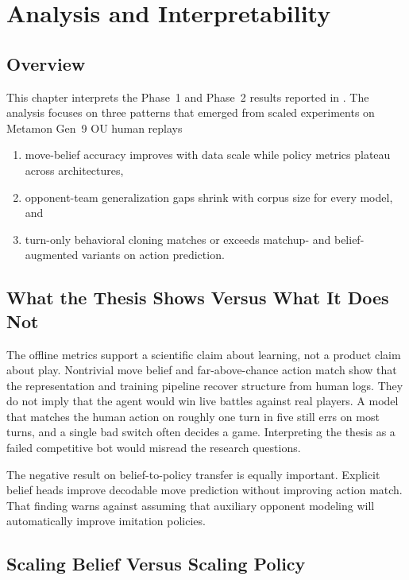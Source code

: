 \chapter{Analysis and Interpretability}
\label{ch:analysis}

\section{Overview}

This chapter interprets the Phase~1 and Phase~2 results reported in
. The analysis focuses on three patterns that emerged from
scaled experiments on Metamon Gen~9 OU human replays
\begin{enumerate}
  \item move-belief accuracy improves with data scale while policy metrics plateau
    across architectures,
  \item opponent-team generalization gaps shrink with corpus size for every
    model, and
  \item turn-only behavioral cloning matches or exceeds matchup- and
    belief-augmented variants on action prediction.
\end{enumerate}

\section{What the Thesis Shows Versus What It Does Not}

The offline metrics support a scientific claim about learning, not a product
claim about play. Nontrivial move belief and far-above-chance action match show
that the representation and training pipeline recover structure from human logs.
They do not imply that the agent would win live battles against real players.
A model that matches the human action on roughly one turn in five still errs on
most turns, and a single bad switch often decides a game. Interpreting the
thesis as a failed competitive bot would misread the research questions.

The negative result on belief-to-policy transfer is equally important. Explicit
belief heads improve decodable move prediction without improving action match.
That finding warns against assuming that auxiliary opponent modeling will
automatically improve imitation policies.

\section{Scaling Belief Versus Scaling Policy}

